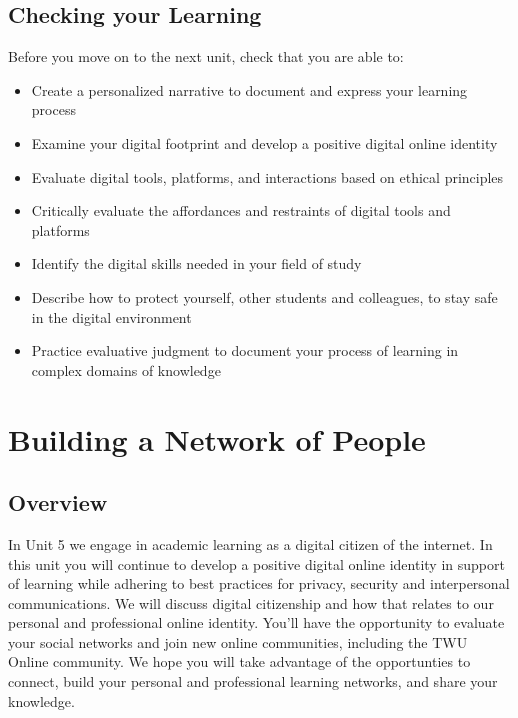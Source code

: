 \documentclass[
]{book}
\providecommand{\tightlist}{%
  \setlength{\itemsep}{0pt}\setlength{\parskip}{0pt}}
\theoremstyle{definition}
\theoremstyle{definition}
\theoremstyle{definition}
\theoremstyle{definition}
\theoremstyle{remark}
\begin{document}
\hypertarget{checking-your-learning-3}{%
\section*{Checking your Learning}\label{checking-your-learning-3}}

\begin{progress}
Before you move on to the next unit, check that you are able to:

\begin{itemize}
\tightlist
\item
  Create a personalized narrative to document and express your learning process\\
\item
  Examine your digital footprint and develop a positive digital online identity\\
\item
  Evaluate digital tools, platforms, and interactions based on ethical principles\\
\item
  Critically evaluate the affordances and restraints of digital tools and platforms\\
\item
  Identify the digital skills needed in your field of study\\
\item
  Describe how to protect yourself, other students and colleagues, to stay safe in the digital environment\\
\item
  Practice evaluative judgment to document your process of learning in complex domains of knowledge
\end{itemize}
\end{progress}

\hypertarget{building-a-network-of-people}{%
\chapter{Building a Network of People}\label{building-a-network-of-people}}

\hypertarget{overview-4}{%
\section*{Overview}\label{overview-4}}

In Unit 5 we engage in academic learning as a digital citizen of the internet. In this unit you will continue to develop a positive digital online identity in support of learning while adhering to best practices for privacy, security and interpersonal communications. We will discuss digital citizenship and how that relates to our personal and professional online identity. You'll have the opportunity to evaluate your social networks and join new online communities, including the TWU Online community.
We hope you will take advantage of the opportunties to connect, build your personal and professional learning networks, and share your knowledge.
\end{document}
